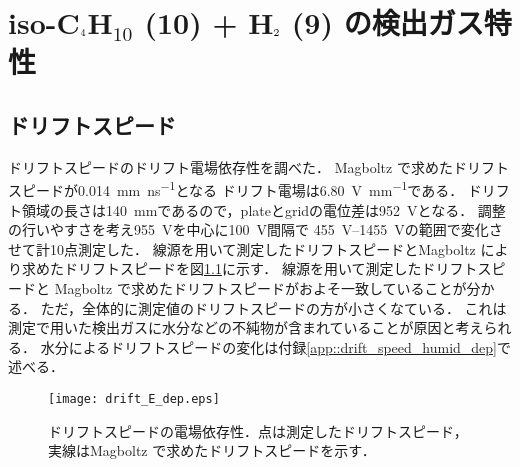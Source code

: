 \documentclass[../master]{subfiles}
\begin{document}
\chapter{iso-C$_{\text 4}$H$_{\text{10}}$ (10) + H$_{\text 2}$ (9) の検出ガス特性}

\section{ドリフトスピード}
ドリフトスピードのドリフト電場依存性を調べた．
Magboltz で求めたドリフトスピードが\SI{0.014}{\milli\metre\per\nano\second}となる
ドリフト電場は\SI{6.80}{\volt\per\milli\metre}である．
ドリフト領域の長さは\SI{140}{\milli\metre}であるので，plateとgridの電位差は\SI{952}{\volt}となる．
調整の行いやすさを考え\SI{955}{\volt}を中心に\SI{100}{\volt}間隔で
\SIrange{455}{1455}{\volt}の範囲で変化させて計10点測定した．
線源を用いて測定したドリフトスピードとMagboltz により求めたドリフトスピードを図\ref{fig::drift_speed_E_dep}に示す．
線源を用いて測定したドリフトスピードと Magboltz で求めたドリフトスピードがおよそ一致していることが分かる．
ただ，全体的に測定値のドリフトスピードの方が小さくなている．
これは測定で用いた検出ガスに水分などの不純物が含まれていることが原因と考えられる．
水分によるドリフトスピードの変化は付録\ref{app::drift_speed_humid_dep}で述べる．
\begin{figure}
  \centering
  \texttt{[image: drift\_E\_dep.eps]}
  \caption{ドリフトスピードの電場依存性．点は測定したドリフトスピード，実線はMagboltz で求めたドリフトスピードを示す．}
  \label{fig::drift_speed_E_dep}
\end{figure}
\end{document}
